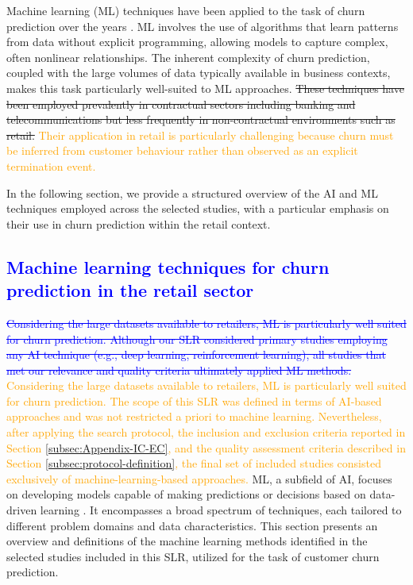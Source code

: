 Machine learning (ML) techniques have been applied to the task of churn prediction over the years \cite{churn-prediction-survery-manzoor-2024}. ML involves the use of algorithms that learn patterns from data without explicit programming, allowing models to capture complex, often nonlinear relationships. The inherent complexity of churn prediction, coupled with the large volumes of data typically available in business contexts, makes this task particularly well-suited to ML approaches. \sout{These techniques have been employed prevalently in contractual sectors including banking and telecommunications but less frequently in non-contractual environments such as retail.} \textcolor{orange}{Their application in retail is particularly challenging because churn must be inferred from customer behaviour rather than observed as an explicit termination event.}

In the following section, we provide a structured overview of the AI and ML techniques employed across the selected studies, with a particular emphasis on their use in churn prediction within the retail context. 

\subsection{\textcolor{blue}{Machine learning techniques for churn prediction in the retail sector}}

\textcolor{blue}{\sout{Considering the large datasets available to retailers, ML is particularly well suited for churn prediction. Although our SLR considered primary studies employing any AI technique (e.g., deep learning, reinforcement learning), all studies that met our relevance and quality criteria ultimately applied ML methods.}} \textcolor{orange}{Considering the large datasets available to retailers, ML is particularly well suited for churn prediction. The scope of this SLR was defined in terms of AI-based approaches and was not restricted a priori to machine learning. Nevertheless, after applying the search protocol, the inclusion and exclusion criteria reported in Section \ref{subsec:Appendix-IC-EC}, and the quality assessment criteria described in Section \ref{subsec:protocol-definition}, the final set of included studies consisted exclusively of machine-learning-based approaches.} ML, a subfield of AI, focuses on developing models capable of making predictions or decisions based on data-driven learning \cite{Sarker2021}. It encompasses a broad spectrum of techniques, each tailored to different problem domains and data characteristics. This section presents an overview and definitions of the machine learning methods identified in the selected studies included in this SLR, utilized for the task of customer churn prediction.

